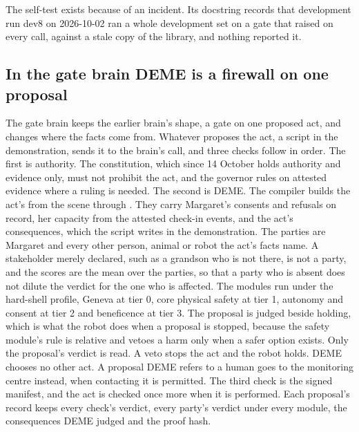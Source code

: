 The self-test exists because of an incident. Its docstring records that development run dev8 on
2026-10-02 ran a whole development set on a gate that raised on every call, against a stale
copy of the library, and nothing reported it.

\subsection{In the gate brain DEME is a firewall on one proposal}\label{sec:deme-gate}

The gate brain keeps the earlier brain's shape, a gate on one proposed act, and changes where the
facts come from. Whatever proposes the act, a script in the demonstration, sends it to the
brain's  call, and three checks follow in order.
The first is authority. The constitution, which since 14 October holds authority and evidence
only, must not prohibit the act, and the governor rules on attested evidence where a ruling is
needed.
The second is DEME. The compiler builds the act's  from the scene through
. They carry Margaret's consents and refusals on record, her capacity
from the attested check-in events, and the act's consequences, which the script writes in the
demonstration.
The parties are Margaret and every other person, animal or robot the act's facts name. A
stakeholder merely declared, such as a grandson who is not there, is not a party, and the scores
are the mean over the parties, so that a party who is absent does not dilute the verdict for the one
who is affected.
The modules run under the hard-shell profile, Geneva at tier 0, core physical safety at tier 1,
autonomy and consent at tier 2 and beneficence at tier 3.
The proposal is judged beside holding, which is what the robot does when a proposal is stopped,
because the safety module's rule is relative and vetoes a harm only when a safer option exists.
Only the proposal's verdict is read. A veto stops the act and the robot holds. DEME chooses no
other act. A proposal DEME refers to a human goes to the monitoring centre instead, when contacting
it is permitted.
The third check is the signed manifest, and the act is checked once more when it is performed.
Each proposal's record keeps every check's verdict, every party's verdict under every module, the
consequences DEME judged and the proof hash.
